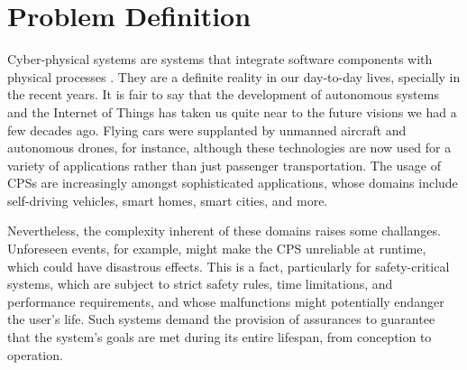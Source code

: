 


\section{Problem Definition}

Cyber-physical systems are systems that integrate software components with physical processes \cite{lee2008cyber}. They are a definite reality in our day-to-day lives, specially in the recent years. It is fair to say that the development of autonomous systems and the Internet of Things has taken us quite near to the future visions we had a few decades ago. Flying cars were supplanted by unmanned aircraft and autonomous drones, for instance, although these technologies are now used for a variety of applications rather than just passenger transportation. The usage of CPSs are increasingly amongst sophisticated applications, whose domains include self-driving vehicles, smart homes, smart cities, and more.

Nevertheless, the complexity inherent of these domains raises some challanges. Unforeseen events, for example, might make the CPS unreliable at runtime, which could have disastrous effects. This is a fact, particularly for safety-critical systems, which are subject to strict safety rules, time limitations, and performance requirements, and whose malfunctions might potentially endanger the user's life. Such systems demand the provision of assurances to guarantee that the system's goals are met during its entire lifespan, from conception to operation. 

